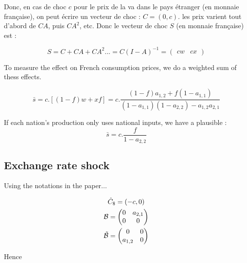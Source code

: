 \documentclass[11pt,a4paper]{article}
\begin{document}
Donc, en cas de choc $c$ pour le prix de la va dans le pays étranger (en monnaie française), on peut écrire un vecteur de choc : $C=\left(0,c\right)$.  les prix varient tout d'abord de  $CA$, puis $CA^2$, etc. Donc le vecteur de choc $S$ (en monnaie française) est : 


\begin{equation*}
S=C+CA+CA^2...=C(I-A)^{-1}=\left(\begin{matrix}cw  &   cx\end{matrix}\right)
\end{equation*}

To measure the effect on French consumption prices, we do a weighted sum of thess effects.

\begin{equation}
\bar{s}=c.\left[\left(1-f\right)w+xf\right]=c.\frac{\left(1-f\right)a_{1,2}+f\left(1-a_{1,1}\right)}{\left(1-a_{1,1}\right)\left(1-a_{2,2}\right)-a_{1,2}a_{2,1}}
\end{equation}

If each nation's production only uses national inputs, we have a plausible :
\begin{equation*}
\bar{s}=c.\frac{f}{1-a_{2,2}}
\end{equation*}

\subsection{Exchange rate shock}

Using the notations in the paper...

\begin{gather*}
\hat{C}_\$=\left(-c,0\right)
\\
\cal B = \left(\begin{matrix}0&a_{2,1}\\0&0\end{matrix}\right)
\\
\tilde{\cal B} = \left(\begin{matrix}0&0\\a_{1,2}&0\end{matrix}\right)
\end{gather*}

Hence
\end{document}
